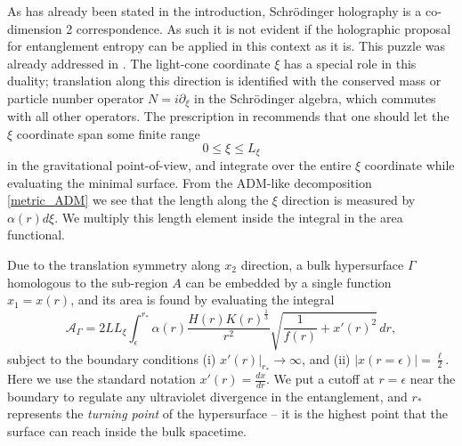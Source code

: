 \documentclass[12pt,a4paper]{article}
\numberwithin{equation}{section}
\begin{document}
As has already been stated in the introduction, Schr\"{o}dinger holography is a  co-dimension 2 correspondence. As such it is not evident if the holographic proposal for entanglement entropy can be applied in this context as it is. This puzzle was already addressed in \cite{Kim:2012nb}. The light-cone coordinate $\xi$ has a special role in this duality; translation along this direction is identified with the conserved mass or particle number operator $N = i\partial_{\xi}$ in the Schr\"{o}dinger algebra, which commutes with all other operators. The prescription in \cite{Kim:2012nb} recommends that one should let the $\xi$ coordinate span some finite range \[0\leq\xi\leq L_{\xi}\] in the gravitational point-of-view, and integrate over the entire $\xi$ coordinate while evaluating the minimal surface. From the ADM-like decomposition \eqref{metric_ADM} we see that the length along the $\xi$ direction is measured by $\alpha\left(r\right) d\xi$. We multiply this length element inside the integral in the area functional.

Due to the translation symmetry along $x_2$ direction, a bulk hypersurface $\Gamma$ homologous to the sub-region $A$ can be embedded by a single function $x_1=x(r)$, and its area is found by evaluating the integral
%
\begin{equation} \label{area_func}
	\mathcal{A}_{\Gamma} = 2 L L_{\xi} \int_{\epsilon}^{r_{\ast}} \alpha(r) \frac{H(r) K(r)^\frac{1}{3}}{r^2} \sqrt{\frac{1}{f(r)} + x'(r)^2}\,dr ,
\end{equation}
%
subject to the boundary conditions (i) $x'(r)\rvert_{r_*}\to \infty$, and (ii) $\lvert x\left(r=\epsilon\right)\rvert = \frac{\ell}{2}$. Here we use the standard notation $x'(r) = \frac{dx}{dr}$. We put a cutoff at $r=\epsilon$ near the boundary to regulate any ultraviolet divergence in the entanglement, and $r_*$ represents the \textit{turning point} of the hypersurface -- it is the highest point that the surface can reach inside the bulk spacetime.
\end{document}
